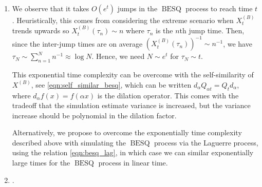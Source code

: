 \documentclass[11pt,a4,reqno]{amsart}
\numberwithin{equation}{section}
\theoremstyle{definition}
\theoremstyle{remark}
\DeclareMathOperator{\besq}{BESQ}
\begin{document}
	\begin{enumerate}
		\item We observe that it takes $O(e^t)$ jumps in the $\besq$ process to reach time $t$. Heuristically, this comes from considering the extreme scenario when $X_t^{(B)}$ trends upwards so $X_t^{(B)}(\tau_n) \sim n$ where $\tau_n$ is the $n$th jump time. Then, since the inter-jump times are on average $(X_t^{(B)}(\tau_n))^{-1} \sim n^{-1}$, we have $\tau_N \sim \sum_{n = 1}^N n^{-1} \approx \log N$. Hence, we need $N \sim e^t$ for $\tau_N \sim t$. 
		
		This exponential time complexity can be overcome with the self-similarity of $X^{(B)}$, see \eqref{eqn:self_similar_besq}, which can be written $d_{\alpha} Q_{\alpha t} = Q_{t} d_\alpha$, where $d_\alpha f(x) = f(\alpha x)$ is the dilation operator. This comes with the tradeoff that the simulation estimate variance is increased, but the variance increase should be polynomial in the dilation factor. 
		
		Alternatively, we propose to overcome the exponentially time complexity described above with simulating the $\besq$ process via the Laguerre process, using the relation \eqref{eqn:besq_lag}, in which case we can similar exponentially large times for the $\besq$ process in linear time. 
		
		\item .

	\end{enumerate}
	



\end{document}
